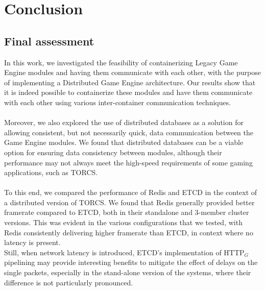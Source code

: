 
\chapter{Conclusion}
\label{cap:conclusion}

\section{Final assessment}
In this work, we investigated the feasibility of containerizing Legacy Game Engine modules and having them communicate with each other, with the purpose of implementing a Distributed Game Engine architecture. Our results show that it is indeed possible to containerize these modules and have them communicate with each other using various inter-container communication techniques. \\ \\
Moreover, we also explored the use of distributed databases as a solution for allowing consistent, but not necessarily quick, data communication between the Game Engine modules. We found that distributed databases can be a viable option for ensuring data consistency between modules, although their performance may not always meet the high-speed requirements of some gaming applications, such as TORCS. \\ \\
To this end, we compared the performance of Redis and ETCD in the context of a distributed version of TORCS. We found that Redis generally provided better framerate compared to ETCD, both in their standalone and 3-member cluster versions. This was evident in the various configurations that we tested, with Redis consistently delivering higher framerate than ETCD, in context where no latency is present. \\
Still, when network latency is introduced, ETCD's implementation of HTTP$_G$ pipelining may provide interesting benefits to mitigate the effect of delays on the single packets, especially in the stand-alone version of the systems, where their difference is not particularly pronounced. \\ \\
